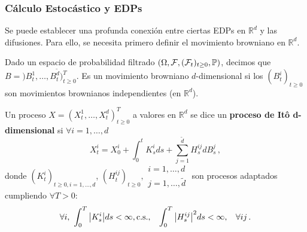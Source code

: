 \subsubsection{Cálculo Estocástico y EDPs}
Se puede establecer una profunda conexión entre ciertas EDPs en $\mathbb{R}^{d}$ y las difusiones. Para ello, se necesita primero definir el movimiento browniano en $\mathbb{R}^d$. 
\begin{definition}
Dado un espacio de probabilidad filtrado $(\Omega, \mathcal{F},(\mathcal{F}_t)_{t \geq 0}, \P)$, decimos que $B = )B_t^1, \ldots, B_t^{\tilde{d}})_{t \ge 0}^{T}$. Es un movimiento browniano $d$-dimensional si los $(B_t^i)_{t\ge 0}$ son movimientos brownianos independientes (en $\mathbb{R}^d$). 
\end{definition}

\begin{definition}
\label{def:ito_d}
Un proceso $X = (X_t^1, \ldots, X_t^d)_{t \ge 0}^T$ a valores en $\mathbb{R}^d$ se dice un \textbf{proceso de It\^{o} d-dimensional} si $\forall i = 1, \ldots, d$ 
\begin{equation*}
    \label{eq:sde_6}
    X_t^i = X_0^i + \int_{0}^{t} K_s^i ds + \sum_{j=1}^{\tilde{d}} H_s^{ij} dB_s^j \,,
\end{equation*}
donde $(K_{t}^{i})_{t \ge 0, i=1,\ldots,d}$, $(H^{ij}_{t})_{t \ge  0}, \substack{i =1, \ldots,d \\ j =1, \ldots,\tilde{d}}$ son procesos adaptados cumpliendo $\forall T > 0$: 
\begin{equation*}
    \forall i, ~ \int_{0}^{T} \abs{K_s^i} ds < \infty, \text{c.s.}, \espacio \int_{0}^{T} \abs{H^{ij}_s}^2 ds < \infty, \espacio \forall ij \,.
\end{equation*}
\end{definition}

